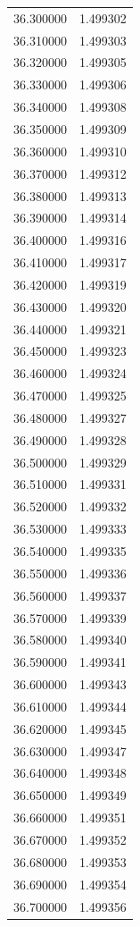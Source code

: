 \begin{tabular}{rr}
36.300000 & 1.499302 \\
36.310000 & 1.499303 \\
36.320000 & 1.499305 \\
36.330000 & 1.499306 \\
36.340000 & 1.499308 \\
36.350000 & 1.499309 \\
36.360000 & 1.499310 \\
36.370000 & 1.499312 \\
36.380000 & 1.499313 \\
36.390000 & 1.499314 \\
36.400000 & 1.499316 \\
36.410000 & 1.499317 \\
36.420000 & 1.499319 \\
36.430000 & 1.499320 \\
36.440000 & 1.499321 \\
36.450000 & 1.499323 \\
36.460000 & 1.499324 \\
36.470000 & 1.499325 \\
36.480000 & 1.499327 \\
36.490000 & 1.499328 \\
36.500000 & 1.499329 \\
36.510000 & 1.499331 \\
36.520000 & 1.499332 \\
36.530000 & 1.499333 \\
36.540000 & 1.499335 \\
36.550000 & 1.499336 \\
36.560000 & 1.499337 \\
36.570000 & 1.499339 \\
36.580000 & 1.499340 \\
36.590000 & 1.499341 \\
36.600000 & 1.499343 \\
36.610000 & 1.499344 \\
36.620000 & 1.499345 \\
36.630000 & 1.499347 \\
36.640000 & 1.499348 \\
36.650000 & 1.499349 \\
36.660000 & 1.499351 \\
36.670000 & 1.499352 \\
36.680000 & 1.499353 \\
36.690000 & 1.499354 \\
36.700000 & 1.499356 \\

\end{tabular}
